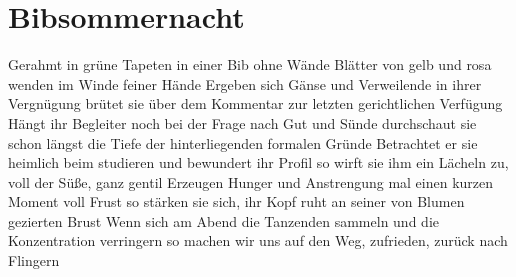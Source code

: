 \section{Bibsommernacht}
\begin{flushleft}
Gerahmt in grüne Tapeten in einer Bib ohne Wände \linebreak
Blätter von gelb und rosa wenden im Winde feiner Hände \vspace{3mm} \linebreak 
Ergeben sich Gänse und Verweilende in ihrer Vergnügung \linebreak
brütet sie über dem Kommentar zur letzten gerichtlichen Verfügung \vspace{3mm} \linebreak 
Hängt ihr Begleiter noch bei der Frage nach Gut und Sünde \linebreak
durchschaut sie schon längst die Tiefe der hinterliegenden formalen Gründe \vspace{3mm} \linebreak 
Betrachtet er sie heimlich beim studieren und bewundert ihr Profil \linebreak
so wirft sie ihm ein Lächeln zu, voll der Süße, ganz gentil \vspace{3mm} \linebreak 
Erzeugen Hunger und Anstrengung mal einen kurzen Moment voll Frust \linebreak
so stärken sie sich, ihr Kopf ruht an seiner von Blumen gezierten Brust \vspace{3mm} \linebreak  
Wenn sich am Abend die Tanzenden sammeln und die Konzentration verringern \linebreak
so machen wir uns auf den Weg, zufrieden, zurück nach Flingern \linebreak
\end{flushleft}


